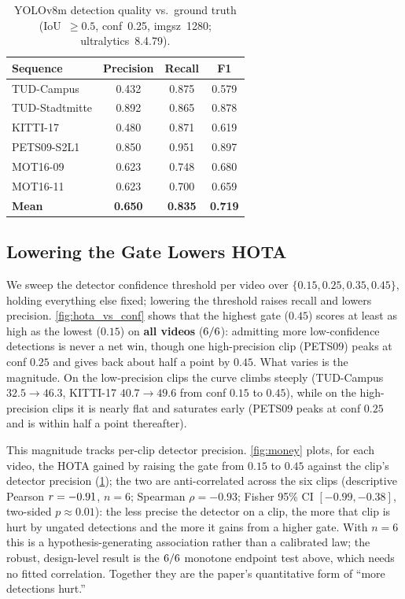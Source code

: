 \begin{table}[t]
\centering
\caption{YOLOv8m detection quality vs.\ ground truth (IoU~$\geq 0.5$, conf~0.25, imgsz~1280;
ultralytics~8.4.79).}
\label{tab:detector}
\small
\begin{tabular}{lccc}
\toprule
\textbf{Sequence} & Precision & Recall & F1 \\
\midrule
TUD-Campus     & 0.432 & 0.875 & 0.579 \\
TUD-Stadtmitte & 0.892 & 0.865 & 0.878 \\
KITTI-17       & 0.480 & 0.871 & 0.619 \\
PETS09-S2L1    & 0.850 & 0.951 & 0.897 \\
MOT16-09       & 0.623 & 0.748 & 0.680 \\
MOT16-11       & 0.623 & 0.700 & 0.659 \\
\midrule
\textbf{Mean}  & \textbf{0.650} & \textbf{0.835} & \textbf{0.719} \\
\bottomrule
\end{tabular}
\end{table}

\subsection{Lowering the Gate Lowers HOTA}
\label{sec:hurt}

We sweep the detector confidence threshold per video over $\{0.15, 0.25, 0.35, 0.45\}$, holding
everything else fixed; lowering the threshold raises recall and lowers precision.
\cref{fig:hota_vs_conf} shows that the highest gate ($0.45$) scores at least as high as the lowest
($0.15$) on \textbf{all \nVideos{} videos} ($6/6$): admitting more low-confidence detections
is never a net win, though one high-precision clip (PETS09) peaks at conf $0.25$ and gives back about
half a point by $0.45$. What varies is the magnitude. On the low-precision clips the curve climbs steeply (TUD-Campus
$32.5\rightarrow46.3$, KITTI-17 $40.7\rightarrow49.6$ from conf $0.15$ to $0.45$), while on the
high-precision clips it is nearly flat and saturates early (PETS09 peaks at conf $0.25$ and is within
half a point thereafter).

This magnitude tracks per-clip detector precision. \cref{fig:money} plots, for each video,
the HOTA gained by raising the gate from $0.15$ to $0.45$ against the clip's detector precision
(\cref{tab:detector}); the two are anti-correlated across the six clips (descriptive Pearson
$r = -0.91$, $n=6$; Spearman $\rho = -0.93$; Fisher 95\% CI $[-0.99, -0.38]$,
two-sided $p \approx 0.01$): the less
precise the detector on a clip, the more that clip is hurt by ungated detections and the more it gains
from a higher gate. With $n=6$ this is a hypothesis-generating association rather than a calibrated
law; the robust, design-level result is the $6/6$ monotone endpoint test above, which
needs no fitted correlation. Together they are the paper's quantitative form of ``more detections hurt.''

